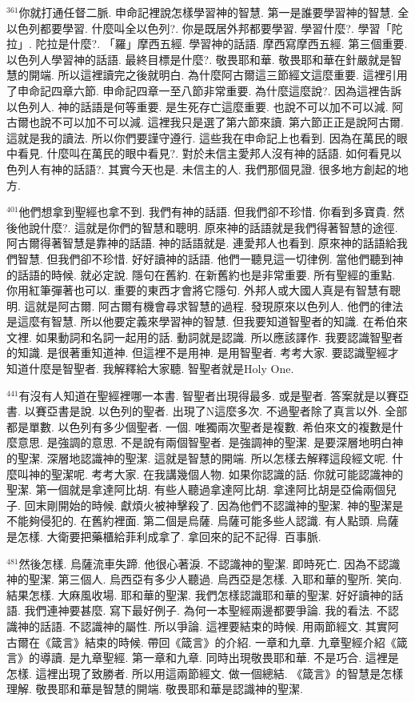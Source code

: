 \documentclass{book}
\begin{document}
$^{361}$你就打通任督二脈.
申命記裡說怎樣學習神的智慧.
第一是誰要學習神的智慧.
全以色列都要學習.
什麼叫全以色列?.
你是既居外邦都要學習.
學習什麼?.
學習「陀拉」.
陀拉是什麼?.
「羅」摩西五經.
學習神的話語.
摩西寫摩西五經.
第三個重要.
以色列人學習神的話語.
最終目標是什麼?.
敬畏耶和華.
敬畏耶和華在針嚴就是智慧的開端.
所以這裡讀完之後就明白.
為什麼阿古爾這三節經文這麼重要.
這裡引用了申命記四章六節.
申命記四章一至八節非常重要.
為什麼這麼說?.
因為這裡告訴以色列人.
神的話語是何等重要.
是生死存亡這麼重要.
也說不可以加不可以減.
阿古爾也說不可以加不可以減.
這裡我只是選了第六節來讀.
第六節正正是說阿古爾.
這就是我的讀法.
所以你們要謹守遵行.
這些我在申命記上也看到.
因為在萬民的眼中看見.
什麼叫在萬民的眼中看見?.
對於未信主愛邦人沒有神的話語.
如何看見以色列人有神的話語?.
其實今天也是.
未信主的人.
我們那個見證.
很多地方創起的地方.

$^{401}$他們想拿到聖經也拿不到.
我們有神的話語.
但我們卻不珍惜.
你看到多寶貴.
然後他說什麼?.
這就是你們的智慧和聰明.
原來神的話語就是我們得著智慧的途徑.
阿古爾得著智慧是靠神的話語.
神的話語就是.
連愛邦人也看到.
原來神的話語給我們智慧.
但我們卻不珍惜.
好好讀神的話語.
他們一聽見這一切律例.
當他們聽到神的話語的時候.
就必定說.
隱句在舊約.
在新舊約也是非常重要.
所有聖經的重點.
你用紅筆彈著也可以.
重要的東西才會將它隱句.
外邦人或大國人真是有智慧有聰明.
這就是阿古爾.
阿古爾有機會尋求智慧的過程.
發現原來以色列人.
他們的律法是這麼有智慧.
所以他要定義來學習神的智慧.
但我要知道智聖者的知識.
在希伯來文裡.
如果動詞和名詞一起用的話.
動詞就是認識.
所以應該譯作.
我要認識智聖者的知識.
是很著重知道神.
但這裡不是用神.
是用智聖者.
考考大家.
要認識聖經才知道什麼是智聖者.
我解釋給大家聽.
智聖者就是Holy One.

$^{441}$有沒有人知道在聖經裡哪一本書.
智聖者出現得最多.
或是聖者.
答案就是以賽亞書.
以賽亞書是說.
以色列的聖者.
出現了N這麼多次.
不過聖者除了真言以外.
全部都是單數.
以色列有多少個聖者.
一個.
唯獨兩次聖者是複數.
希伯來文的複數是什麼意思.
是強調的意思.
不是說有兩個智聖者.
是強調神的聖潔.
是要深層地明白神的聖潔.
深層地認識神的聖潔.
這就是智慧的開端.
所以怎樣去解釋這段經文呢.
什麼叫神的聖潔呢.
考考大家.
在我講幾個人物.
如果你認識的話.
你就可能認識神的聖潔.
第一個就是拿達阿比胡.
有些人聽過拿達阿比胡.
拿達阿比胡是亞倫兩個兒子.
回末剛開始的時候.
獻煩火被神擊殺了.
因為他們不認識神的聖潔.
神的聖潔是不能夠侵犯的.
在舊約裡面.
第二個是烏薩.
烏薩可能多些人認識.
有人點頭.
烏薩是怎樣.
大衛要把藥櫃給菲利成拿了.
拿回來的記不記得.
百事脈.

$^{481}$然後怎樣.
烏薩流車失蹄.
他很心著淚.
不認識神的聖潔.
即時死亡.
因為不認識神的聖潔.
第三個人.
烏西亞有多少人聽過.
烏西亞是怎樣.
入耶和華的聖所.
笑向.
結果怎樣.
大麻風收場.
耶和華的聖潔.
我們怎樣認識耶和華的聖潔.
好好讀神的話語.
我們連神要甚麼.
寫下最好例子.
為何一本聖經兩邊都要爭論.
我的看法.
不認識神的話語.
不認識神的屬性.
所以爭論.
這裡要結束的時候.
用兩節經文.
其實阿古爾在《箴言》結束的時候.
帶回《箴言》的介紹.
一章和九章.
九章聖經介紹《箴言》的導讀.
是九章聖經.
第一章和九章.
同時出現敬畏耶和華.
不是巧合.
這裡是怎樣.
這裡出現了致勝者.
所以用這兩節經文.
做一個總結.
《箴言》的智慧是怎樣理解.
敬畏耶和華是智慧的開端.
敬畏耶和華是認識神的聖潔.
\end{document}

